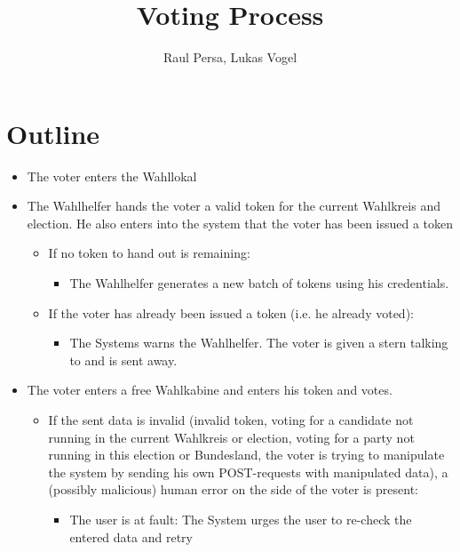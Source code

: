 \documentclass[10pt,a4paper]{article}
\author{Raul Persa, Lukas Vogel}
\title{Voting Process}
\begin{document}
\maketitle

\section*{Outline}
\begin{itemize}
	\item The voter enters the Wahllokal
	\item The Wahlhelfer hands the voter a valid token for the current Wahlkreis and election. 
		He also enters into the system that the voter has been issued a token
		\begin{itemize}
			\item If no token to hand out is remaining: 
			\begin{itemize}
				\item The Wahlhelfer generates a new batch of tokens using his credentials.
			\end{itemize}
			\item If the voter has already been issued a token (i.e. he already voted):
			\begin{itemize}
				\item The Systems warns the Wahlhelfer. The voter is given a stern talking to and is sent away.
			\end{itemize}
		\end{itemize}
		

	\item The voter enters a free Wahlkabine and enters his token and votes.
		\begin{itemize}
			\item If the sent data is invalid (invalid token, 
			voting for a candidate not running in the current Wahlkreis or election, 
			voting for a party not running in this election or Bundesland, the voter is 
			trying to manipulate the system 
			by sending his own POST-requests with manipulated data), a (possibly malicious) human error on the side of the voter is present:
				\begin{itemize}
					\item The user is at fault: 
					The System urges the user to re-check the entered data and retry
				\end{itemize}
		\end{itemize}


\end{itemize}
\end{document}
